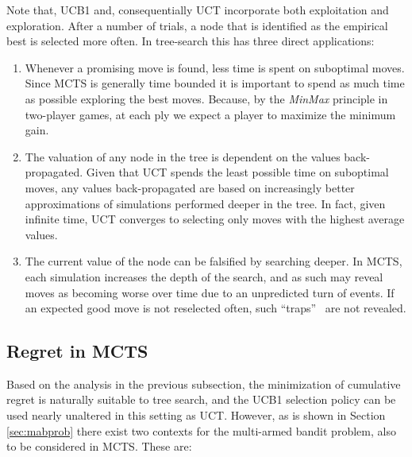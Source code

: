 \documentclass{kecsmstr}
\begin{document}
Note that, UCB1 and, consequentially UCT incorporate both exploitation and exploration. After a number of trials, a node that is identified as the empirical best is selected more often. In tree-search this has three direct applications:
\begin{enumerate} 

\item Whenever a promising move is found, less time is spent on suboptimal moves. Since MCTS is generally time bounded it is important to spend as much time as possible exploring the best moves. Because, by the \emph{MinMax} principle in two-player games, at each ply we expect a player to maximize the minimum gain.

\item The valuation of any node in the tree is dependent on the values back-propagated. Given that UCT spends the least possible time on suboptimal moves, any values back-propagated are based on increasingly better approximations of simulations performed deeper in the tree. In fact, given infinite time, UCT converges to selecting only moves with the highest average values.

\item The current value of the node can be falsified by searching deeper. In MCTS, each simulation increases the depth of the search, and as such may reveal moves as becoming worse over time due to an unpredicted turn of events. If an expected good move is not reselected often, such ``traps''~ are not revealed.

\end{enumerate}
\newpage
\subsection{Regret in MCTS}

Based on the analysis in the previous subsection, the minimization of cumulative regret is naturally suitable to tree search, and the UCB1 selection policy can be used nearly unaltered in this setting as UCT. However, as is shown in Section \ref{sec:mabprob} there exist two contexts for the multi-armed bandit problem, also to be considered in MCTS. These are:
\end{document}
